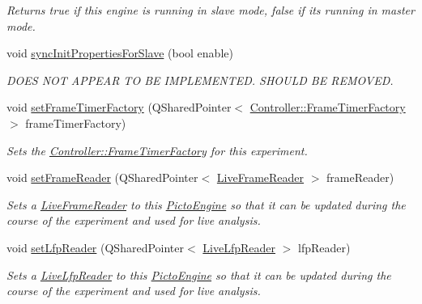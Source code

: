 \begin{DoxyCompactItemize}
\begin{DoxyCompactList}\small\item\em Returns true if this engine is running in slave mode, false if its running in master mode. \end{DoxyCompactList}\item 
void \hyperlink{class_picto_1_1_engine_1_1_picto_engine_ab4387bc82d82693b922ed43664e2d549}{sync\-Init\-Properties\-For\-Slave} (bool enable)
\begin{DoxyCompactList}\small\item\em D\-O\-E\-S N\-O\-T A\-P\-P\-E\-A\-R T\-O B\-E I\-M\-P\-L\-E\-M\-E\-N\-T\-E\-D. S\-H\-O\-U\-L\-D B\-E R\-E\-M\-O\-V\-E\-D. \end{DoxyCompactList}\item 
void \hyperlink{class_picto_1_1_engine_1_1_picto_engine_a08cc95b2de79179f14a6b4845f2e817c}{set\-Frame\-Timer\-Factory} (Q\-Shared\-Pointer$<$ \hyperlink{class_picto_1_1_controller_1_1_frame_timer_factory}{Controller\-::\-Frame\-Timer\-Factory} $>$ frame\-Timer\-Factory)
\begin{DoxyCompactList}\small\item\em Sets the \hyperlink{class_picto_1_1_controller_1_1_frame_timer_factory}{Controller\-::\-Frame\-Timer\-Factory} for this experiment. \end{DoxyCompactList}\item 
void \hyperlink{class_picto_1_1_engine_1_1_picto_engine_ae9998c870bb8d5175143f9ce262bba92}{set\-Frame\-Reader} (Q\-Shared\-Pointer$<$ \hyperlink{class_picto_1_1_live_frame_reader}{Live\-Frame\-Reader} $>$ frame\-Reader)
\begin{DoxyCompactList}\small\item\em Sets a \hyperlink{class_picto_1_1_live_frame_reader}{Live\-Frame\-Reader} to this \hyperlink{class_picto_1_1_engine_1_1_picto_engine}{Picto\-Engine} so that it can be updated during the course of the experiment and used for live analysis. \end{DoxyCompactList}\item 
void \hyperlink{class_picto_1_1_engine_1_1_picto_engine_a08c45ba223ecedbeb47ba2daa55957e8}{set\-Lfp\-Reader} (Q\-Shared\-Pointer$<$ \hyperlink{class_picto_1_1_live_lfp_reader}{Live\-Lfp\-Reader} $>$ lfp\-Reader)
\begin{DoxyCompactList}\small\item\em Sets a \hyperlink{class_picto_1_1_live_lfp_reader}{Live\-Lfp\-Reader} to this \hyperlink{class_picto_1_1_engine_1_1_picto_engine}{Picto\-Engine} so that it can be updated during the course of the experiment and used for live analysis. \end{DoxyCompactList}\item 

\end{DoxyCompactItemize}

